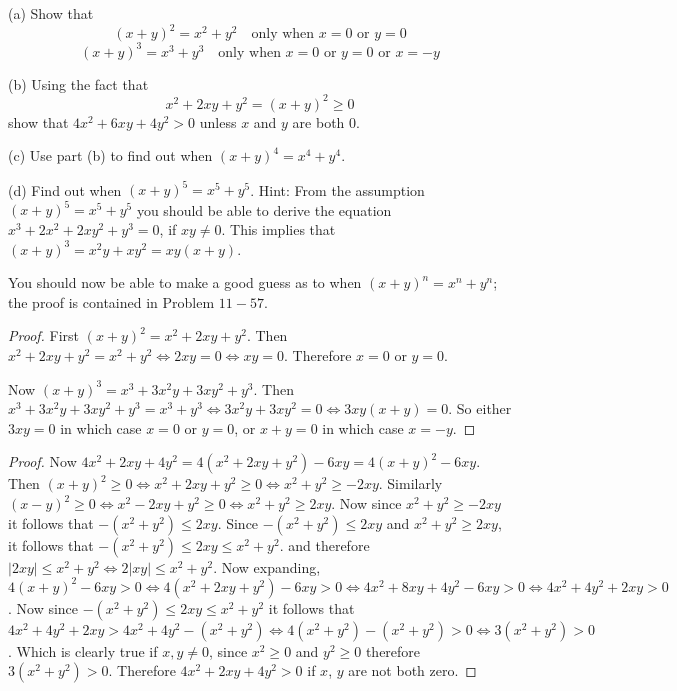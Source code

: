 \begin{tcolorbox}[title=Problem 16, breakable]
    (a) Show that 
    \[(x + y)^2 = x^2 + y^2 \quad \text{only when $x = 0$ or $y = 0$}\]
    \[(x + y)^3 = x^3 + y^3 \quad \text{only when $x = 0$ or $y = 0$ or $x = -y$}\]

    (b) Using the fact that 
    \[x^2 + 2xy + y^2 = (x + y)^2 \ge 0\]
    show that $4x^2 + 6xy + 4y^2 > 0$ unless $x$ and $y$ are both $0$.

    (c) Use part (b) to find out when $(x + y)^4 = x^4 + y^4$.

    (d) Find out when $(x + y)^5 = x^5 + y^5$. Hint: From the assumption 
    $(x + y)^5 = x^5 + y^5$ you should be able to derive the equation 
    $x^3 + 2x^2 + 2xy^2 + y^3 = 0$, if $xy \not = 0$. This implies 
    that $(x + y)^3 = x^2y + xy^2 = xy(x + y)$.

    You should now be able to make a good guess as to when $(x + y)^n = x^n + y^n$;
    the proof is contained in Problem $11-57$.
\end{tcolorbox}

\begin{proof}
    First $(x + y)^2 = x^2 + 2xy + y^2$.
    Then $x^2 + 2xy + y^2 = x^2 + y^2 \iff 2xy = 0 \iff xy = 0$.
    Therefore $x = 0$ or $y = 0$.

    Now $(x + y)^3 = x^3 + 3x^2y + 3xy^2 + y^3$.
    Then $x^3 + 3x^2y + 3xy^2 + y^3 = x^3 + y^3 
          \iff 3x^2y + 3xy^2 = 0
          \iff 3xy(x + y) = 0$.
    So either $3xy = 0$ in which case $x = 0$ or $y = 0$,
        or $x + y = 0$ in which case $x = -y$.
\end{proof}

\begin{proof}
    Now $4x^2 + 2xy + 4y^2 = 4(x^2 + 2xy + y^2) - 6xy = 4(x + y)^2 - 6xy$.
    Then $(x + y)^2 \ge 0 \iff x^2 + 2xy + y^2 \ge 0 \iff x^2 + y^2 \ge -2xy$.
    Similarly $(x - y)^2 \ge 0 \iff x^2 - 2xy + y^2 \ge 0 \iff x^2 + y^2 \ge 2xy$.
    Now since $x^2 + y^2 \ge -2xy$ it follows that $-(x^2 + y^2) \le 2xy$.
    Since $-(x^2 + y^2) \le 2xy$ and $x^2 + y^2 \ge 2xy$,
        it follows that $-(x^2 + y^2) \le 2xy \le x^2 + y^2$.
        and therefore $|2xy| \le x^2 + y^2 \iff 2|xy| \le x^2 + y^2$.
    Now expanding, $4(x + y)^2 - 6xy > 0 
                    \iff 4(x^2 + 2xy + y^2) - 6xy > 0
                    \iff 4x^2 + 8xy + 4y^2 - 6xy > 0
                    \iff 4x^2 + 4y^2 + 2xy > 0$.
    Now since $-(x^2 + y^2) \le 2xy \le x^2 + y^2$
        it follows that $4x^2 + 4y^2 + 2xy > 4x^2 + 4y^2 - (x^2 + y^2)
                        \iff 4(x^2 + y^2) - (x^2 + y^2) > 0
                        \iff 3(x^2 + y^2) > 0$.
    Which is clearly true if $x, y \not = 0$, since $x^2 \ge 0$ and $y^2 \ge 0$
        therefore $3(x^2 + y^2) > 0$.
    Therefore $4x^2 + 2xy + 4y^2 > 0$ if $x$, $y$ are not both zero.
\end{proof}

